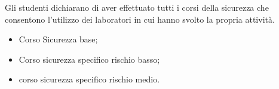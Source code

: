 \documentclass[11pt,a4paper]{article}
\begin{document}
Gli studenti dichiarano di aver effettuato tutti i corsi della sicurezza che consentono l'utilizzo dei laboratori in cui hanno svolto la propria attività.

\begin{itemize}
    \item Corso Sicurezza base;
    \item Corso sicurezza specifico rischio basso;
    \item corso sicurezza specifico rischio medio.
\end{itemize}

\pagebreak


\end{document}
